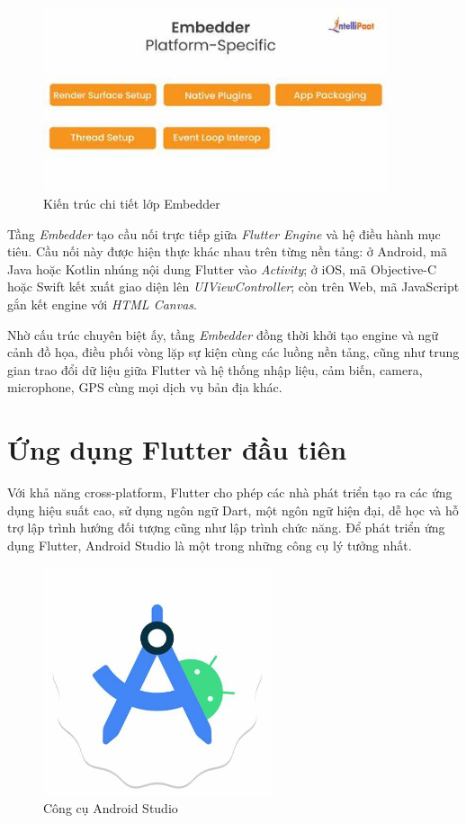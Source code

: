 \documentclass[../DoAn.tex]{subfiles}
\numberwithin{figure}{chapter}
\begin{document}
\begin{figure}[H]
    \centering
    \includegraphics[width=0.9\textwidth]{Hinhve/Chuong5/embedderlayer.jpg}
    \caption{Kiến trúc chi tiết lớp Embedder}
    \label{fig:embedderlayer}
\end{figure}

Tầng \textit{Embedder} tạo cầu nối trực tiếp giữa \textit{Flutter Engine} và hệ điều hành mục tiêu. Cầu nối này được hiện thực khác nhau trên từng nền tảng: ở Android, mã Java hoặc Kotlin nhúng nội dung Flutter vào \textit{Activity}; ở iOS, mã Objective-C hoặc Swift kết xuất giao diện lên \textit{UIViewController}; còn trên Web, mã JavaScript gắn kết engine với \textit{HTML Canvas}.

Nhờ cấu trúc chuyên biệt ấy, tầng \textit{Embedder} đồng thời khởi tạo engine và ngữ cảnh đồ họa, điều phối vòng lặp sự kiện cùng các luồng nền tảng, cũng như trung gian trao đổi dữ liệu giữa Flutter và hệ thống nhập liệu, cảm biến, camera, microphone, GPS cùng mọi dịch vụ bản địa khác.


\section{Ứng dụng Flutter đầu tiên}
Với khả năng cross-platform, Flutter cho phép các nhà phát triển tạo ra các ứng dụng hiệu suất cao, sử dụng ngôn ngữ Dart, một ngôn ngữ hiện đại, dễ học và hỗ trợ lập trình hướng đối tượng cũng như lập trình chức năng. Để phát triển ứng dụng Flutter, Android Studio là một trong những công cụ lý tưởng nhất. 

\begin{figure}[H]
    \centering
    \includegraphics[width=0.6\textwidth]{Hinhve/Chuong5/androidstudio.jpg}
    \caption{Công cụ Android Studio}
    \label{fig:androidstudio}
\end{figure}
\end{document}
